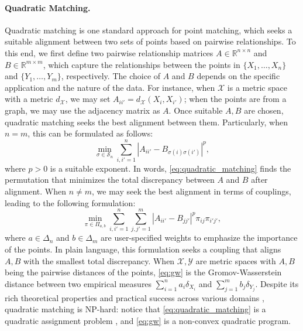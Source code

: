 \documentclass{article}
\theoremstyle{definition}
\newcommand{\cS}{\mathcal{S}}
\newcommand{\cX}{\mathcal{X}}
\newcommand{\cY}{\mathcal{Y}}
\newcommand{\R}{\mathbb{R}}
\begin{document}
\paragraph{Quadratic Matching.}
Quadratic matching is one standard approach for point matching, which seeks a suitable alignment between two sets of points based on pairwise relationships. To this end, we first define two pairwise relationship matrices $A \in \R^{n \times n}$ and $B \in \R^{m \times m}$, which capture the relationships between the points in $\{X_1, \ldots, X_n\}$ and $\{Y_1, \ldots, Y_m\}$, respectively. The choice of $A$ and $B$ depends on the specific application and the nature of the data. For instance, when $\cX$ is a metric space with a metric $d_\cX$, we may set $A_{i i'} = d_\cX(X_i, X_{i'})$; when the points are from a graph, we may use the adjacency matrix as $A$. Once suitable $A, B$ are chosen, quadratic matching seeks the best alignment between them. Particularly, when $n = m$, this can be formulated as follows:
\begin{equation}
    \label{eq:quadratic_matching}
    \min_{\sigma \in \cS_n} \sum_{i, i' = 1}^{n} |A_{i i'} - B_{\sigma(i) \sigma(i')}|^p,
\end{equation}
where $p > 0$ is a suitable exponent. In words, \eqref{eq:quadratic_matching} finds the permutation that minimizes the total discrepancy between $A$ and $B$ after alignment. When $n \neq m$, we may seek the best alignment in terms of couplings, leading to the following formulation:
\begin{equation}
    \label{eq:gw}
    \min_{\pi \in \Pi_{a, b}} \sum_{i, i' = 1}^{n} \sum_{j, j' = 1}^{m} |A_{i i'} - B_{j j'}|^p \pi_{i j} \pi_{i' j'},
\end{equation}
where $a \in \Delta_n$ and $b \in \Delta_m$ are user-specified weights to emphasize the importance of the points. In plain language, this formulation seeks a coupling that aligns $A, B$ with the smallest total discrepancy. When $\cX, \cY$ are metric spaces with $A, B$ being the pairwise distances of the points, \eqref{eq:gw} is the Gromov-Wasserstein distance \cite{memoli2011gromov} between two empirical measures $\sum_{i = 1}^{n} a_i \delta_{X_i}$ and $\sum_{j = 1}^{m} b_j \delta_{Y_j}$. Despite its rich theoretical properties \cite{memoli2024comparison,dumont2025existence} and practical success across various domains \cite{peyre2016gromov,solomon2016entropic,alvarez2018gromov,xu2019gromov,bunne2019learning,hur2024reversible}, quadratic matching is NP-hard: notice that \eqref{eq:quadratic_matching} is a quadratic assignment problem \cite{koopmans1957assignment,loiola2007survey}, and \eqref{eq:gw} is a non-convex quadratic program.
\end{document}
